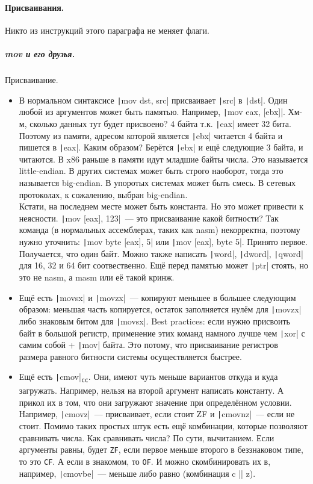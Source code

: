 \documentclass{article}
\begin{document}
    \paragraph{Присваивания.}
    Никто из инструкций этого параграфа не меняет флаги.
    \subparagraph{mov и его друзья.}
    Присваивание.
    \begin{itemize}
        \item В нормальном синтаксисе \texttt|mov dst, src| присваивает \texttt|src| в \texttt|dst|. Один любой из аргументов может быть памятью. Например, \texttt|mov eax, [ebx]|. Хм-м, сколько данных тут будет присвоено? 4 байта т.к. \texttt|eax| имеет 32 бита. Поэтому из памяти, адресом которой является \texttt|ebx| читается 4 байта и пишется в \texttt|eax|. Каким образом? Берётся \texttt|ebx| и ещё следующие 3 байта, и читаются. В x86 раньше в памяти идут младшие байты числа. Это называется little-endian. В других системах может быть строго наоборот, тогда это называется big-endian. В упоротых системах может быть смесь. В сетевых протоколах, к сожалению, выбран big-endian.\\
        Кстати, на последнем месте может быть константа. Но это может привести к неясности. \texttt|mov [eax], 123|~--- это присваивание какой битности? Так команда (в нормальных ассемблерах, таких как nasm) некорректна, поэтому нужно уточнить: \texttt|mov byte [eax], 5| или \texttt|mov [eax], byte 5|. Принято первое. Получается, что один байт. Можно также написать \texttt|word|, \texttt|dword|, \texttt|qword| для 16, 32 и 64 бит соотвественно. Ещё перед памятью может \texttt|ptr| стоять, но это не nasm, а masm или её такой кринж.
        \item Ещё есть \texttt|movsx| и \texttt|movzx|~--- копируют меньшее в большее следующим образом: меньшая часть копируется, остаток заполняется нулём для \texttt|movzx| либо знаковым битом для \texttt|movsx|. Best practices: если нужно присвоить байт в большой регистр, применение этих команд намного лучше чем \texttt|xor| с самим собой + \texttt|mov| байта. Это потому, что присваивание регистров размера равного битности системы осуществляется быстрее.
        \item Ещё есть \texttt|cmov|\textsubscript{\Verb|cc|}. Они, имеют чуть меньше вариантов откуда и куда загружать. Например, нельзя на второй аргумент написать константу. А прикол их в том, что они загружают значение при определённом условии. Например, \texttt|cmovz|~--- присваивает, если стоит ZF и \texttt|cmovnz|~--- если не стоит. Помимо таких простых штук есть ещё комбинации, которые позволяют сравнивать числа. Как сравнивать числа? По сути, вычитанием. Если аргументы равны, будет \Verb|ZF|, если первое меньше второго в беззнаковом типе, то это \Verb|CF|. А если в знакомом, то \Verb|OF|. И можно скомбинировать их в, например, \texttt|cmovbe|~--- меньше либо равно (комбинация c || z).\\

\end{itemize}
\end{document}
